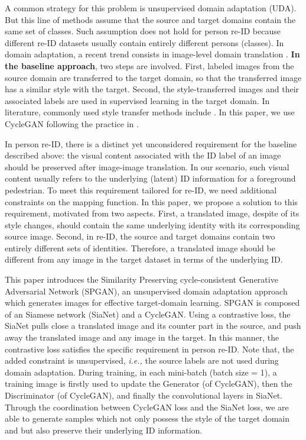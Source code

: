 \documentclass[10pt,twocolumn,letterpaper]{article}
\begin{document}
A common strategy for this problem is unsupervised domain adaptation (UDA). But this line of methods assume that the source and target domains contain the same set of classes. Such assumption does not hold for person re-ID because different re-ID datasets usually contain entirely different persons (classes). 
In domain adaptation, a recent trend consists in image-level domain translation \cite{ cycledomain, DBLP:journals/corr/BousmalisSDEK16, DBLP:conf/nips/LiuT16}. \textbf{In the baseline approach}, two steps are involved. First, labeled images from the source domain are transferred to the target domain, so that the transferred image has a similar style with the target. Second, the style-transferred images and their associated labels are used in supervised learning in the target domain. In literature, commonly used style transfer methods include \cite{DBLP:journals/corr/LiuBK17,DiscoGAN, DualGAN, cycle}. In this paper, we use CycleGAN \cite{cycle} following the practice in \cite{DBLP:journals/corr/LiuBK17, cycledomain}.

In person re-ID, there is a distinct yet unconsidered requirement for the baseline described above: the visual content associated with the ID label of an image should be preserved after image-image translation. In our scenario, such visual content usually refers to the underlying (latent) ID information for a foreground pedestrian. To meet this requirement tailored for re-ID, we need additional constraints on the mapping function. 
In this paper, we propose a solution to this requirement, motivated from two aspects. First, a translated image, despite of its style changes, should contain the same underlying identity with its corresponding source image. Second, in re-ID, the source and target domains contain two entirely different sets of identities. Therefore, a translated image should be different from any image in the target dataset in terms of the underlying ID. 

This paper introduces the Similarity Preserving cycle-consistent Generative Adversarial Network (SPGAN), an unsupervised domain adaptation approach which generates images for effective target-domain learning. SPGAN is composed of an Siamese network (SiaNet) and a CycleGAN. Using a contrastive loss, the SiaNet pulls close a translated image and its counter part in the source, and push away the translated image and any image in the target. In this manner, the contrastive loss satisfies the specific requirement in person re-ID. Note that, the added constraint is unsupervised, \emph{i.e.,} the source labels are not used during domain adaptation.
During training, in each mini-batch (batch size = 1), a training image is firstly used to update the Generator (of CycleGAN), then the Discriminator (of CycleGAN), and finally the convolutional layers in SiaNet. Through the coordination between CycleGAN loss and the SiaNet loss, we are able to generate samples which not only possess the style of the target domain and but also preserve their underlying ID information. 
\end{document}
